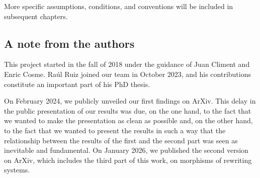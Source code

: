 \documentclass{amsart}
\theoremstyle{plain}
\theoremstyle{definition}
\begin{document}

More specific assumptions, conditions, and conventions will be included in subsequent chapters.

\subsection{A note from the authors}
This project started in the fall of 2018 under the guidance of Juan Climent and Enric Cosme.  Ra\'{u}l Ruiz joined our team in October 2023, and his contributions  constitute an important part of his PhD thesis.

On February 2024, we publicly unveiled our first findings on ArXiv.  This delay in the public presentation of our results was due, on the one hand, to the fact that we wanted to make the presentation as clean as possible and, on the other hand, to the fact that we wanted to present the results in such a way that the relationship between the results of the first and the second part was seen as inevitable and fundamental.  On January 2026, we published the second version on ArXiv, which includes the third part of this work, on morphisms of rewriting systems.
\end{document}
